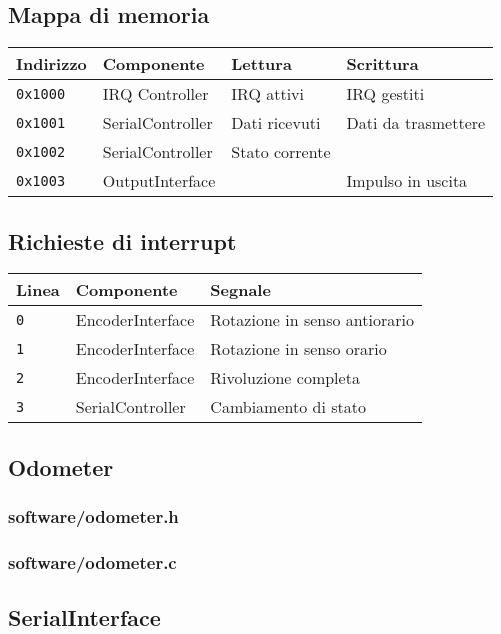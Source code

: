 \documentclass [11pt,a4paper,oneside]{paper}
\newcommand{\inputC}[1]{}
\begin{document}
\subsection{Mappa di memoria}
\begin{tabular}{|l|l|l|l|}
\hline
Indirizzo & Componente & Lettura & Scrittura \\
\hline
\texttt{0x1000} & IRQ Controller & IRQ attivi & IRQ gestiti \\
\hline
\texttt{0x1001} & SerialController & Dati ricevuti & Dati da trasmettere \\
\hline
\texttt{0x1002} & SerialController & Stato corrente & \\
\hline
\texttt{0x1003} & OutputInterface & & Impulso in uscita \\
\hline
\end{tabular}

\inputC{software/memory_map.h}

\subsection{Richieste di interrupt}
\begin{tabular}{|l|l|l|}
\hline
Linea & Componente & Segnale \\
\hline
\texttt{0} & EncoderInterface & Rotazione in senso antiorario \\
\hline
\texttt{1} & EncoderInterface & Rotazione in senso orario \\
\hline
\texttt{2} & EncoderInterface & Rivoluzione completa \\
\hline
\texttt{3} & SerialController & Cambiamento di stato \\
\hline
\end{tabular}

\subsection{Odometer}
\subsubsection{software/odometer.h}
\inputC{software/odometer.h}
\subsubsection{software/odometer.c}
\inputC{software/odometer.c}

\subsection{SerialInterface}
\end{document}
